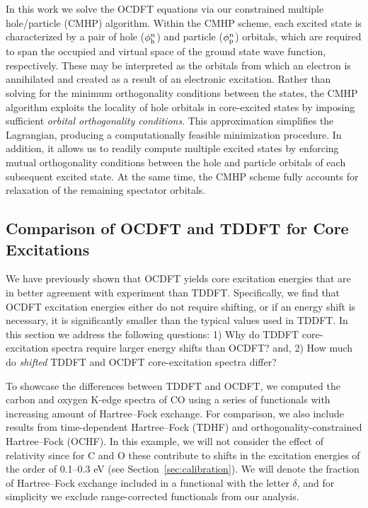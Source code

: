 \documentclass{article}
\begin{document}
In this work we solve the OCDFT equations via our constrained multiple hole/particle (CMHP) algorithm.\cite{Wallace-OCDFT}
Within the CMHP scheme, each excited state is characterized by a pair of hole ($\phi_{\rm h}^n$) and particle ($\phi_{\rm p}^n$) orbitals, which are required to span the occupied and virtual space of the ground state wave function, respectively.  These may be interpreted as the orbitals from which an electron is annihilated and created as a result of an electronic excitation.
Rather than solving for the minimum orthogonality conditions between the states, the CMHP algorithm exploits the locality of hole orbitals in core-excited states by imposing sufficient \textit{orbital orthogonality conditions}. This approximation simplifies the Lagrangian, producing a computationally feasible minimization procedure.
In addition, it allows us to readily compute multiple excited states by enforcing mutual orthogonality conditions between the hole and particle orbitals of each subsequent excited state.
At the same time, the CMHP scheme fully accounts for relaxation of the remaining spectator orbitals. 

\subsection{Comparison of OCDFT and TDDFT for Core Excitations}
We have previously shown that OCDFT yields core excitation energies that are in better agreement with experiment than TDDFT.\cite{Wallace-OCDFT}
Specifically, we find that OCDFT excitation energies either do not require shifting, or if an energy shift is necessary, it is significantly smaller than the typical values used in TDDFT.
In this section we address the following questions:
1) Why do TDDFT core-excitation spectra require larger energy shifts than OCDFT?
and, 2) How much do \textit{shifted} TDDFT and OCDFT core-excitation spectra differ?

To showcase the differences between TDDFT and OCDFT, we computed the carbon and oxygen K-edge spectra of CO using a series of functionals with increasing amount of Hartree--Fock exchange.
For comparison, we also include results from time-dependent Hartree--Fock (TDHF) and orthogonality-constrained Hartree--Fock (OCHF).
In this example, we will not consider the effect of relativity since for C and O these contribute to shifts in the excitation energies of the order of 0.1--0.3 eV (see Section~\ref{sec:calibration}).
We will denote the fraction of Hartree--Fock exchange included in a functional with the letter $\delta$, and for simplicity we exclude range-corrected functionals from our analysis.
\end{document}
